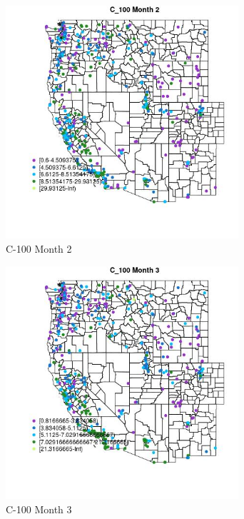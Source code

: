 \begin{figure} 
\centering  
\includegraphics[width=0.77\textwidth]{Code_Outputs/ML_input_report_ML_input_PM25_Step5_part_d_de_duplicated_aves_ML_input_MapObsMo2C_100.jpg} 
\caption{\label{fig:ML_input_report_ML_input_PM25_Step5_part_d_de_duplicated_aves_ML_inputMapObsMo2C_100}C-100 Month 2} 
\end{figure} 
 

\begin{figure} 
\centering  
\includegraphics[width=0.77\textwidth]{Code_Outputs/ML_input_report_ML_input_PM25_Step5_part_d_de_duplicated_aves_ML_input_MapObsMo3C_100.jpg} 
\caption{\label{fig:ML_input_report_ML_input_PM25_Step5_part_d_de_duplicated_aves_ML_inputMapObsMo3C_100}C-100 Month 3} 
\end{figure} 
 

